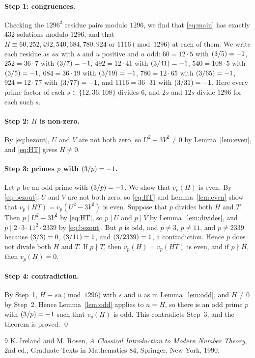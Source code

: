 \documentclass[11pt]{article}
\newcommand{\leg}[2]{\mathchoice{\biggl(\dfrac{#1}{#2}\biggr)}{(#1/#2)}{(#1/#2)}{(#1/#2)}}
\begin{document}
\paragraph{Step 1: congruences.} Checking the $1296^2$ residue pairs modulo $1296$, we find that \eqref{eq:main} has exactly 432 solutions modulo $1296$, and that $H\equiv60,\allowbreak 252,\allowbreak 492,\allowbreak 540,\allowbreak 684,\allowbreak 780,\allowbreak 924\text{ or }1116\pmod{1296}$ at each of them. We write each residue as $su$ with $s$ and $u$ positive and $u$ odd: $60=12\cdot5$ with $\leg{3}{5}=-1$, $252=36\cdot7$ with $\leg{3}{7}=-1$, $492=12\cdot41$ with $\leg{3}{41}=-1$, $540=108\cdot5$ with $\leg{3}{5}=-1$, $684=36\cdot19$ with $\leg{3}{19}=-1$, $780=12\cdot65$ with $\leg{3}{65}=-1$, $924=12\cdot77$ with $\leg{3}{77}=-1$, and $1116=36\cdot31$ with $\leg{3}{31}=-1$. Here every prime factor of each $s\in\{12,36,108\}$ divides $6$, and $2s$ and $12s$ divide $1296$ for each such $s$.

\paragraph{Step 2: $H$ is non-zero.} By \eqref{eq:bezout}, $U$ and $V$ are not both zero, so $U^2-3V^2\neq0$ by Lemma~\ref{lem:even}, and \eqref{eq:HT} gives $H\neq0$.

\paragraph{\texorpdfstring{Step 3: primes $p$ with $\leg{3}{p}=-1$.}{Step 3: inert primes.}} Let $p$ be an odd prime with $\leg{3}{p}=-1$. We show that $v_p(H)$ is even. By \eqref{eq:bezout}, $U$ and $V$ are not both zero, so \eqref{eq:HT} and Lemma~\ref{lem:even} show that $v_p(HT)=v_p(U^2-3V^2)$ is even. Suppose that $p$ divides both $H$ and $T$. Then $p\mid U^2-3V^2$ by \eqref{eq:HT}, so $p\mid U$ and $p\mid V$ by Lemma~\ref{lem:divides}, and $p\mid 2\cdot 3\cdot 11^{2}\cdot 2339$ by \eqref{eq:bezout}. But $p$ is odd, and $p\neq3$, $p\neq11$, and $p\neq2339$ because $\leg{3}{3}=0$, $\leg{3}{11}=1$, and $\leg{3}{2339}=1$, a contradiction. Hence $p$ does not divide both $H$ and $T$. If $p\nmid T$, then $v_p(H)=v_p(HT)$ is even, and if $p\nmid H$, then $v_p(H)=0$.

\paragraph{Step 4: contradiction.} By Step~1, $H\equiv su\pmod{1296}$ with $s$ and $u$ as in Lemma~\ref{lem:odd}, and $H\neq0$ by Step~2. Hence Lemma~\ref{lem:odd} applies to $n=H$, so there is an odd prime $p$ with $\leg{3}{p}=-1$ such that $v_p(H)$ is odd. This contradicts Step~3, and the theorem is proved.
\qed

\begin{thebibliography}{9}
 K. Ireland and M. Rosen, \emph{A Classical Introduction to Modern Number Theory}, 2nd ed., Graduate Texts in Mathematics 84, Springer, New York, 1990.
\end{thebibliography}
\end{document}
